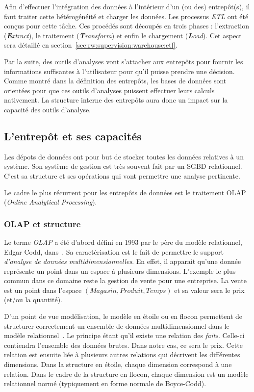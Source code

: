 Afin d'effectuer l'intégration des données à l'intérieur d'un (ou des) entrepôt(s), il faut traiter cette hétérogénéité et charger les données. Les processus \textit{ETL} ont été conçus pour cette tâche. Ces procédés sont découpés en trois phases : l'extraction (\textit{\textbf{E}xtract}), le traitement (\textit{\textbf{T}ransform}) et enfin le chargement (\textit{\textbf{L}oad}). Cet aspect sera détaillé en section~\ref{sec:rw:supervision:warehouse:etl}.

Par la suite, des outils d'analyses vont s'attacher aux entrepôts pour fournir les informations suffisantes à l'utilisateur pour qu'il puisse prendre une décision. Comme montré dans la définition des entrepôts, les bases de données sont orientées pour que ces outils d'analyses puissent effectuer leurs calculs nativement. La structure interne des entrepôts aura donc un impact sur la capacité des outils d'analyse.

\subsection{L'entrepôt et ses capacités}\label{sec:rw:supervision:warehouse:warehouse}
Les dépots de données ont pour but de stocker toutes les données relatives à un système. Son système de gestion est très souvent fait par un SGBD relationnel. C'est sa structure et ses opérations qui vont permettre une analyse pertinente.

Le cadre le plus récurrent pour les entrepôts de données est le traitement OLAP (\textit{Online Analytical Processing}). 
\subsubsection{OLAP et structure}
Le terme \textit{OLAP} a été d'abord défini en 1993 par le père du modèle relationnel, Edgar Codd, dans~\cite{Codd:olap}. Sa caractérisation est le fait de permettre le support \textit{d'analyse de données multidimensionnelles}. En effet, il apparait qu'une donnée représente un point dans un espace à plusieurs dimensions. L'exemple le plus commun dans ce domaine reste la gestion de vente pour une entreprise. La vente est un point dans l'espace $(Magasin, Produit, Temps)$ et sa valeur sera le prix (et/ou la quantité). 

D'un point de vue modélisation, le modèle en étoile ou en flocon permettent de structurer correctement un ensemble de données multidimensionnel dans le modèle relationnel~\cite{Levene:snowflake}. Le principe étant qu'il existe une relation des \textit{faits}. Celle-ci contiendra l'ensemble des données brutes. Dans notre cas, ce sera le prix. Cette relation est ensuite liée à plusieurs autres relations qui décrivent les différentes dimensions. Dans la structure en étoile, chaque dimension correspond à une relation. Dans le cadre de la structure en flocon, chaque dimension est un modèle relationnel normé (typiquement en forme normale de Boyce-Codd). 
